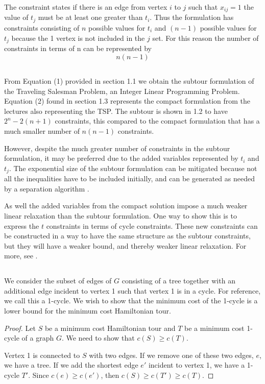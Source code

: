 \documentclass[11pt,a4paper,english]{article}
\begin{document}
The constraint states if there is an edge from vertex $i$ to $j$ such that $x_{ij} = 1$ the value of $t_{j}$ must be at least one greater than $t_{i}$. Thus the formulation has constraints consisting of $n$ possible values for $t_{i}$ and $(n-1)$ possible values for $t_{j}$ because the 1 vertex is not included in the $j$ set. For this reason the number of constraints in terms of n can be represented by $$n(n-1)$$

\subsection{}
From Equation (1) provided in section 1.1 we obtain the subtour formulation of the Traveling Salesman Problem, an Integer Linear Programming Problem.
Equation (2) found in section 1.3 represents the compact formulation from the lectures also representing the TSP. The subtour is shown in 1.2 to have $2^n - 2(n+1)$ constraints, this compared to the compact formulation that has a much smaller number of $n(n-1)$ constraints. 

However, despite the much greater number of constraints in the subtour formulation, it may be preferred due to the added variables represented by $t_{i}$ and $t_{j}$. The exponential size of the subtour formulation can be mitigated because not all the inequalities have to be included initially, and can be generated as needed by a separation algorithm \citep{Pataki}.

As well the added variables from the compact solution impose a much weaker linear relaxation than the subtour formulation. One way to show this is to express the $t$ constraints in terms of cycle constraints. These new constraints can be constructed in a way to have the same structure as the subtour constraints, but they will have a weaker bound, and thereby weaker linear relaxation. For more, see \citep{Pataki}.

\subsection{}
We consider the subset of edges of $G$ consisting of a tree together with an additional edge incident to vertex 1 such that vertex 1 is in a cycle. For reference, we call this a 1-cycle. We wish to show that the minimum cost of the 1-cycle is a lower bound for the minimum cost Hamiltonian tour.

\begin{proof}
Let $S$ be a minimum cost Hamiltonian tour and $T$ be a minimum cost 1-cycle of a graph $G$. We need to show that $c(S) \geq c(T)$.

Vertex 1 is connected to $S$ with two edges. If we remove one of these two edges, $e$, we have a tree. If we add the shortest edge $e'$ incident to vertex 1, we have a 1-cycle $T'$. Since $c(e) \geq c(e')$, then $c(S) \geq c(T') \geq c(T)$.
\end{proof}
\end{document}
